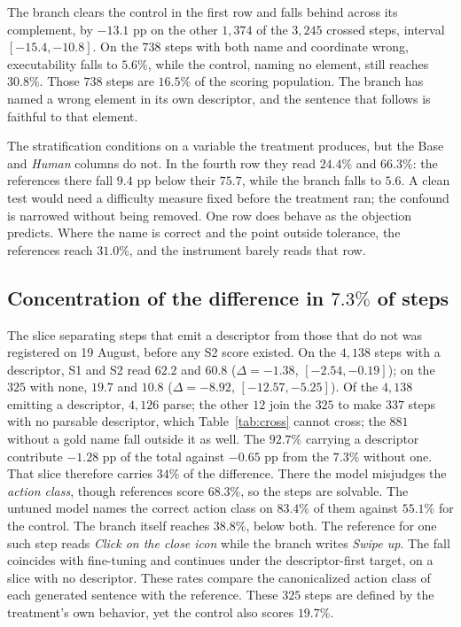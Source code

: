 \documentclass[conference]{IEEEtran}
\begin{document}
The branch clears the control in the first row and falls behind across its complement, by
$-13.1$ pp on the other $1{,}374$ of the $3{,}245$ crossed steps, interval $[-15.4, -10.8]$. On
the $738$ steps with both name and coordinate wrong, executability falls to $5.6\%$, while the
control, naming no element, still reaches $30.8\%$. Those $738$ steps are $16.5\%$ of the scoring population. The branch has named a wrong
element in its own descriptor, and the sentence that follows is faithful to that element.

The stratification conditions on a variable the treatment produces, but the Base and
\emph{Human} columns do not. In the fourth row they read $24.4\%$ and $66.3\%$: the references
there fall $9.4$ pp below their $75.7$, while the branch falls to $5.6$. A clean test would need a difficulty measure fixed before the treatment ran; the confound
is narrowed without being removed. One row does
behave as the objection predicts. Where the name is correct and the point outside tolerance,
the references reach $31.0\%$, and the instrument barely reads that row.

\subsection{Concentration of the difference in \texorpdfstring{$7.3\%$}{7.3\%} of steps}
\label{sec:noslice}
The slice separating steps that emit a descriptor from those that do not was registered on
19 August, before any S2 score existed. On the $4{,}138$ steps with a descriptor, S1 and S2 read
$62.2$ and $60.8$ ($\Delta = -1.38$, $[-2.54, -0.19]$); on the $325$ with none, $19.7$ and $10.8$
($\Delta = -8.92$, $[-12.57, -5.25]$). Of the $4{,}138$ emitting a descriptor, $4{,}126$ parse;
the other $12$ join the $325$ to make $337$ steps with no parsable descriptor, which
Table~\ref{tab:cross} cannot cross; the $881$ without a gold name fall outside it as well. The $92.7\%$ carrying a descriptor contribute
$-1.28$ pp of the total against $-0.65$ pp from the $7.3\%$ without one. That slice therefore
carries $34\%$ of the difference. There the model misjudges the \emph{action class}, though references
score $68.3\%$, so the steps are solvable. The untuned model names the correct action class on
$83.4\%$ of them against $55.1\%$ for the control. The branch itself reaches $38.8\%$, below both. The reference for one such step reads
\emph{Click on the close icon} while the branch writes \emph{Swipe up}. The fall
coincides with fine-tuning and continues under the descriptor-first target, on a slice with
no descriptor. These rates compare
the canonicalized action class of each generated sentence with the reference. These
$325$ steps are defined by the treatment's own behavior, yet the control also scores $19.7\%$.
\end{document}
